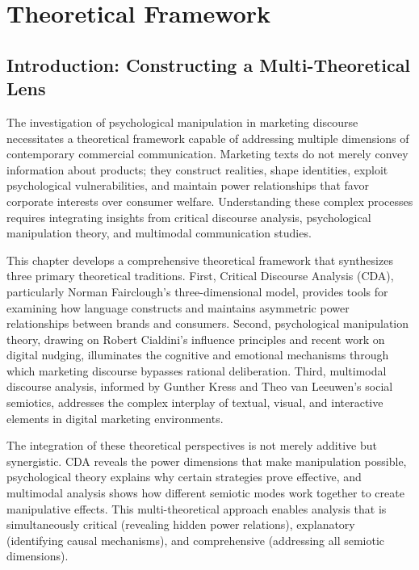 
\chapter{Theoretical Framework}
\label{ch:theory}

\section{Introduction: Constructing a Multi-Theoretical Lens}
\label{sec:theory_intro}

The investigation of psychological manipulation in marketing discourse necessitates a theoretical framework capable of addressing multiple dimensions of contemporary commercial communication. Marketing texts do not merely convey information about products; they construct realities, shape identities, exploit psychological vulnerabilities, and maintain power relationships that favor corporate interests over consumer welfare. Understanding these complex processes requires integrating insights from critical discourse analysis, psychological manipulation theory, and multimodal communication studies.

This chapter develops a comprehensive theoretical framework that synthesizes three primary theoretical traditions. First, Critical Discourse Analysis (CDA), particularly Norman Fairclough's three-dimensional model, provides tools for examining how language constructs and maintains asymmetric power relationships between brands and consumers. Second, psychological manipulation theory, drawing on Robert Cialdini's influence principles and recent work on digital nudging, illuminates the cognitive and emotional mechanisms through which marketing discourse bypasses rational deliberation. Third, multimodal discourse analysis, informed by Gunther Kress and Theo van Leeuwen's social semiotics, addresses the complex interplay of textual, visual, and interactive elements in digital marketing environments.

The integration of these theoretical perspectives is not merely additive but synergistic. CDA reveals the power dimensions that make manipulation possible, psychological theory explains why certain strategies prove effective, and multimodal analysis shows how different semiotic modes work together to create manipulative effects. This multi-theoretical approach enables analysis that is simultaneously critical (revealing hidden power relations), explanatory (identifying causal mechanisms), and comprehensive (addressing all semiotic dimensions).


